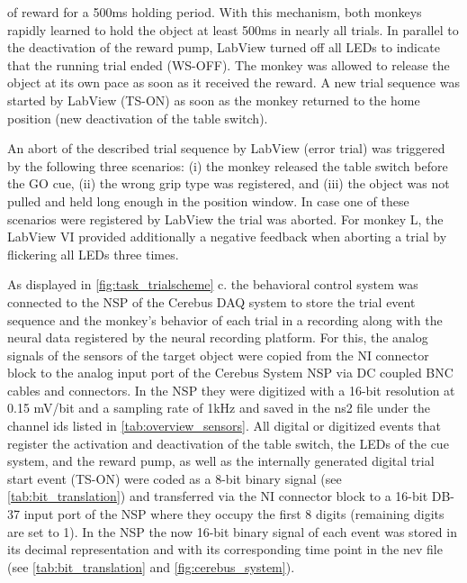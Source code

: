 {of reward for a 500ms holding period. With this mechanism, both monkeys rapidly learned to hold the object at least 500ms in nearly all trials. In parallel to the deactivation of the reward pump, LabView turned off all LEDs to indicate that the running trial ended (WS-OFF). The monkey was allowed to release the object at its own pace as soon as it received the reward. A new trial sequence was started by LabView (TS-ON) as soon as the monkey returned to the home position (new deactivation of the table switch).

An abort of the described trial sequence by LabView (error trial) was triggered by the following three scenarios: (i) the monkey released the table switch before the GO cue, (ii) the wrong grip type was registered, and (iii) the object was not pulled and held long enough in the position window. In case one of these scenarios were registered by LabView the trial was aborted. For monkey L, the LabView VI provided additionally a negative feedback when aborting a trial by flickering all LEDs three times. 

As displayed in \cref{fig:task_trialscheme} c. the behavioral control system was connected to the NSP of the Cerebus DAQ system to store the trial event sequence and the monkey's behavior of each trial in a recording along with the neural data registered by the neural recording platform. For this, the analog signals of the sensors of the target object were copied from the NI connector block to the analog input port of the Cerebus System NSP via DC coupled BNC cables and connectors. In the NSP they were digitized with a 16-bit resolution at 0.15 mV/bit and a sampling rate of 1kHz and saved in the ns2 file under the channel ids listed in \cref{tab:overview_sensors}. All digital or digitized events that register the activation and deactivation of the table switch, the LEDs of the cue system, and the reward pump, as well as the internally generated digital trial start event (TS-ON) were coded as a 8-bit binary signal (see \cref{tab:bit_translation}) and transferred via the NI connector block to a 16-bit DB-37 input port of the NSP where they occupy the first 8 digits (remaining digits are set to 1). In the NSP the now 16-bit binary signal of each event was stored in its decimal representation and with its corresponding time point in the nev file (see \cref{tab:bit_translation} and \cref{fig:cerebus_system}).


}
